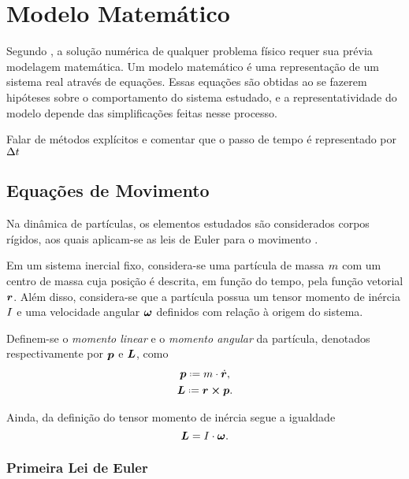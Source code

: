 \chapter{Modelo Matemático}

Segundo , a solução numérica de qualquer problema físico requer sua prévia modelagem matemática. Um modelo matemático é uma representação de um sistema real através de equações. Essas equações são obtidas ao se fazerem hipóteses sobre o comportamento do sistema estudado, e a representatividade do modelo depende das simplificações feitas nesse processo.

\alert{Falar de métodos explícitos e comentar que o passo de tempo é representado por \(\Delta t\)}

\section{Equações de Movimento}

Na dinâmica de partículas, os elementos estudados são considerados corpos rígidos, aos quais aplicam-se as leis de Euler para o movimento .

Em um sistema inercial fixo, considera-se \particle{} uma partícula de massa \(m\) com um centro de massa cuja posição é descrita, em função do tempo, pela função vetorial \(\bm{r}\). Além disso, considera-se que a partícula possua um tensor momento de inércia \(I\) e uma velocidade angular \(\bm{\omega}\) definidos com relação à origem do sistema.

Definem-se o \textit{momento linear} e o \textit{momento angular} da partícula, denotados respectivamente por \(\bm{p}\) e \(\bm{L}\), como
\begin{gather*}
	\linearMomentum \eqdef \mass\cdot\velocity, \\
	\angularMomentum \eqdef \position\cross\linearMomentum.
\end{gather*}

Ainda, da definição do tensor momento de inércia segue a igualdade
\begin{equation*}
	\bm{L} = I\cdot\bm{\omega}.
\end{equation*}

\subsection{Primeira Lei de Euler}

